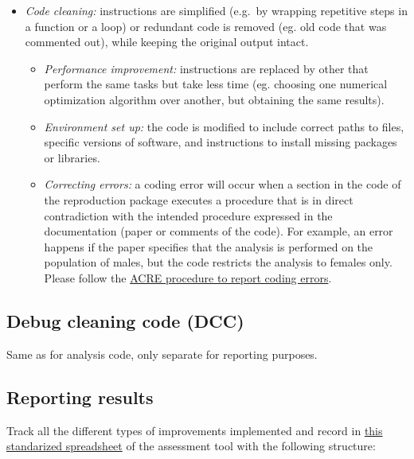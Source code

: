 \documentclass[]{book}
\providecommand{\tightlist}{%
  \setlength{\itemsep}{0pt}\setlength{\parskip}{0pt}}
\begin{document}
\begin{itemize}
\tightlist
\item
  \emph{Code cleaning:} instructions are simplified (e.g.~by wrapping repetitive steps in a function or a loop) or redundant code is removed (eg. old code that was commented out), while keeping the original output intact.

  \begin{itemize}
  \tightlist
  \item
    \emph{Performance improvement:} instructions are replaced by other that perform the same tasks but take less time (eg. choosing one numerical optimization algorithm over another, but obtaining the same results).\\
  \item
    \emph{Environment set up:} the code is modified to include correct paths to files, specific versions of software, and instructions to install missing packages or libraries.\\
  \item
    \emph{Correcting errors:} a coding error will occur when a section in the code of the reproduction package executes a procedure that is in direct contradiction with the intended procedure expressed in the documentation (paper or comments of the code). For example, an error happens if the paper specifies that the analysis is performed on the population of males, but the code restricts the analysis to females only. Please follow the \href{ADD\%20LINK}{ACRE procedure to report coding errors}.
  \end{itemize}
\end{itemize}

\hypertarget{debug-cleaning-code-dcc}{%
\subsection{Debug cleaning code (DCC)}\label{debug-cleaning-code-dcc}}

Same as for analysis code, only separate for reporting purposes.

\hypertarget{reporting-results}{%
\subsection{Reporting results}\label{reporting-results}}

Track all the different types of improvements implemented and record in \href{https://docs.google.com/spreadsheets/d/1LUIdVFH0OfR70C7z07TYeE-uWzKI_JIeWUMaYhqEKK0/edit\#gid=0\&range=A3}{this standarized spreadsheet} of the assessment tool with the following structure:
\end{document}
